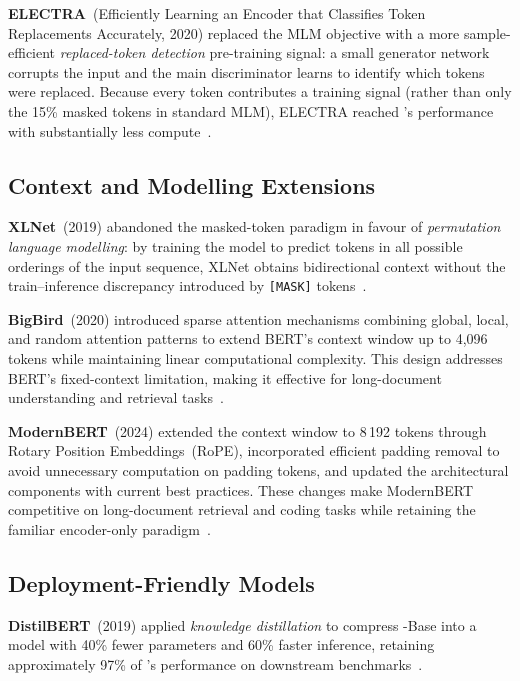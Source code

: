 \textbf{ELECTRA}~(Efficiently Learning an Encoder that Classifies Token Replacements
Accurately, 2020) replaced the MLM objective with a more sample-efficient
\emph{replaced-token detection} pre-training signal: a small generator network
corrupts the input and the main discriminator learns to identify which tokens were
replaced.  Because every token contributes a training signal (rather than only the
15\% masked tokens in standard MLM), ELECTRA reached \bert{}'s performance with
substantially less compute~\cite{clark2020electra}.

\subsection{Context and Modelling Extensions}
\label{subsec:context-successors}

\textbf{XLNet}~(2019) abandoned the masked-token paradigm in favour of
\emph{permutation language modelling}: by training the model to predict tokens in all
possible orderings of the input sequence, XLNet obtains bidirectional context without
the train--inference discrepancy introduced by \texttt{[MASK]}
tokens~\cite{yang2019xlnet}.


\textbf{BigBird}~(2020) introduced sparse attention mechanisms combining global, 
local, and random attention patterns to extend BERT's context window up to 4,096 
tokens while maintaining linear computational complexity. This design addresses 
BERT's fixed-context limitation, making it effective for long-document understanding 
and retrieval tasks~\cite{zaheer2020bigbird}.


\textbf{ModernBERT}~(2024) extended the context window to 8\,192 tokens through
Rotary Position Embeddings~(RoPE), incorporated efficient padding removal to avoid
unnecessary computation on padding tokens, and updated the architectural components
with current best practices.  These changes make ModernBERT competitive on long-document
retrieval and coding tasks while retaining the familiar encoder-only
paradigm~\cite{modernbert2024}.

\subsection{Deployment-Friendly Models}
\label{subsec:lightweight-successors}

\textbf{DistilBERT}~(2019) applied \emph{knowledge distillation} to compress
\bert{}-Base into a model with 40\% fewer parameters and 60\% faster inference,
retaining approximately 97\% of \bert{}'s performance on downstream
benchmarks~\cite{sanh2019distilbert}.

